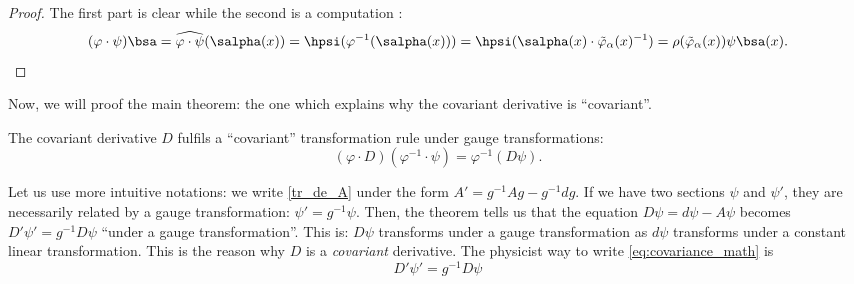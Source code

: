 \begin{proof}
The first part is clear while the second is a computation :
\begin{equation}
    (\varphi\cdot\psi)\bsa=\widehat{\varphi\cdot\psi}(\salpha(x))
                         =\hpsi(\varphi^{-1}(\salpha(x)))
			 =\hpsi(\salpha(x)\cdot\tilde{\varphi}_{\alpha}(x)^{-1})
			 =\rho(\tilde{\varphi}_{\alpha}(x))\psi\bsa(x).
\end{equation}
\end{proof}

Now, we will proof the main theorem: the one which explains why the covariant derivative is ``covariant''.

\begin{theorem}
The covariant derivative $D$ fulfils a ``covariant'' transformation rule under gauge transformations:
\begin{equation}\label{eq:covariance_math}
      (\varphi\cdot D)(\varphi^{-1}\cdot \psi)=\varphi^{-1}(D\psi).
\end{equation}
\label{th:covariance}
\end{theorem}
\begin{remark}
Let us use more intuitive notations: we write \eqref{tr_de_A} under the form $A'=g^{-1} Ag-g^{-1} dg$. If we have two sections  $\psi$ and $\psi'$, they are necessarily related by a gauge transformation: $\psi'=g^{-1}\psi$. Then, the theorem tells us that the equation $D\psi=d\psi-A\psi$ becomes $D'\psi'=g^{-1} D\psi$ ``under a gauge transformation''. This is: $D\psi$ transforms under a gauge transformation as $d\psi$ transforms under a constant linear transformation. This is the reason why $D$ is a \emph{covariant} derivative. The physicist way to write \eqref{eq:covariance_math} is
\begin{equation}\label{eq:covariance_phys}
    D'\psi'=g^{-1} D\psi
\end{equation}
\label{rem:intuitif}
\end{remark}

